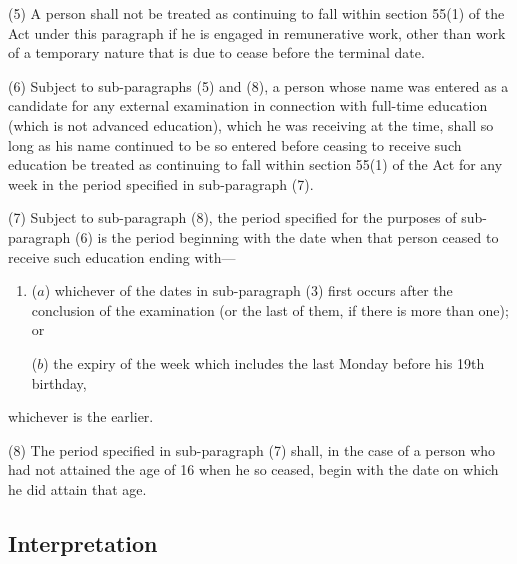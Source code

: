 \documentclass[12pt,a4paper]{article}
\begin{document}
(5) A person shall not be treated as continuing to fall within section 55(1) of the Act under this paragraph if he is engaged in remunerative work, other than work of a temporary nature that is due to cease before the terminal date.

(6) Subject to sub-paragraphs (5) and (8), a person whose name was entered as a candidate for any external examination in connection with full-time education (which is not advanced education), which he was receiving at the time, shall so long as his name continued to be so entered before ceasing to receive such education be treated as continuing to fall within section 55(1) of the Act for any week in the period specified in sub-paragraph (7).

(7) Subject to sub-paragraph (8), the period specified for the purposes of sub-paragraph (6) is the period beginning with the date when that person ceased to receive such education ending with—
\begin{enumerate}\item[]
($a$) whichever of the dates in sub-paragraph (3) first occurs after the conclusion of the examination (or the last of them, if there is more than one); or

($b$) the expiry of the week which includes the last Monday before his 19th birthday,
\end{enumerate}
whichever is the earlier.

(8) The period specified in sub-paragraph (7) shall, in the case of a person who had not attained the age of 16 when he so ceased, begin with the date on which he did attain that age.

\subsection*{Interpretation}
\end{document}
